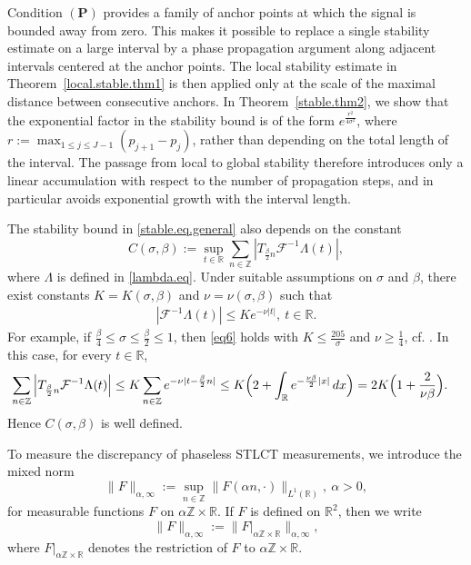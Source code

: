 \documentclass[11pt, reqno]{amsart}
\newcommand{\Z}{\mathbb{Z}}
\newcommand{\R}{\mathbb{R}}
\numberwithin{equation}{section}
\begin{document}
 
Condition $(\mathbf P)$ provides a family of anchor points at which the signal is bounded away from zero. This makes it possible to replace a single stability estimate on a large interval by a phase propagation argument along adjacent intervals centered at the anchor points.  
The local stability estimate in Theorem~\ref{local.stable.thm1} is then applied only at the scale of the maximal distance between consecutive anchors. In Theorem~\ref{stable.thm2}, we show that the exponential factor in the stability bound is of the form $e^{\frac{r^2}{4\sigma^2}}$, where $
r:=\max_{1\le j\le J-1}(p_{j+1}-p_j)$, rather than depending on the total length of the interval. The passage from local to global stability therefore introduces only a linear accumulation with respect to the number of propagation steps, and in particular avoids exponential growth with the interval length.



The stability bound in \eqref{stable.eq.general} also depends on the constant
\begin{equation}\label{Csigma.def}
    C(\sigma,\beta):=  \sup_{t\in\R}\sum_{n\in\Z}     \left|T_{\frac{\beta}{2}n}\mathcal{F}^{-1}\Lambda(t)\right|,
\end{equation}
where $\Lambda$ is defined in \eqref{lambda.eq}. Under suitable assumptions on
$\sigma$ and $\beta$, there exist constants $K=K(\sigma,\beta)$ and
$\nu=\nu(\sigma,\beta)$ such that
\begin{align}\label{eq6}
    |\mathcal{F}^{-1}\Lambda(t)|\le Ke^{-\nu|t|}, \ t\in\R.
\end{align}
For example, if $\frac{\beta}{4}\le \sigma\le \frac{\beta}{2}\le 1$, then
\eqref{eq6} holds with $K\le \frac{205}{\sigma}$ and $\nu\ge \frac14$,
cf. \cite[Lemma~3.11]{grohs2024stable}. In this case, for every $t\in\R$,
\begin{align*}
    \sum_{n\in\Z}\left|T_{\frac{\beta}{2}n}\mathcal{F}^{-1}\Lambda(t)\right|
    &\le
    K\sum_{n\in\Z}e^{-\nu|t-\frac{\beta}{2}n|}  \le
    K\Bigl(2+\int_{\R}e^{-\frac{\nu\beta}{2}|x|}\,dx\Bigr)
    =
    2K\Bigl(1+\frac{2}{\nu\beta}\Bigr).
\end{align*}
Hence $C(\sigma,\beta)$ is well defined.

To measure the discrepancy of phaseless STLCT measurements, we introduce the mixed norm
$$\|F\|_{\alpha,\infty} := \sup_{n\in\mathbb Z}\|F(\alpha n,\cdot)\|_{L^1(\mathbb R)}, \ \alpha>0,$$
for measurable functions $F$ on $\alpha\mathbb Z\times\mathbb R$. If $F$ is
defined on $\mathbb R^2$, then we write
$$
\|F\|_{\alpha,\infty}:= \|F|_{\alpha\mathbb Z\times\mathbb R}\|_{\alpha,\infty},$$
where $F|_{\alpha\mathbb Z\times\mathbb R}$ denotes the restriction of $F$ to
$\alpha\mathbb Z\times\mathbb R$.
\end{document}
